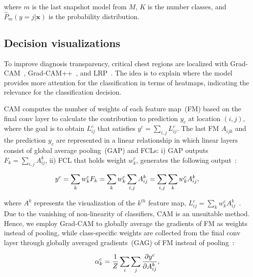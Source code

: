 \documentclass[conference]{IEEEtran}
\begin{document}
where $m$ is the last snapshot model from $M$, $K$ is the number classes, and $\hat{P}_{m}(y=j | \mathbf{x})$ is the probability distribution. 

\subsection{Decision visualizations}
To improve diagnosis transparency, critical chest regions are localized with Grad-CAM~\cite{114}, Grad-CAM++~\cite{chattopadhay2018grad}, and LRP~\cite{LRP2}. The idea is to explain where the model provides more attention for the classification in terms of heatmaps, 
indicating the relevance for the classification decision.

\iffalse
CAM computes the number of weights of each feature map~(FM) based on the final conv layer to calculate the contribution to prediction $y_c$ at location $(i,j)$, where the goal is to obtain $L_{ij}^{c}$ that satisfies $y^{c}=\sum_{i, j} L_{ij}^{c}$. The last FM $A_{ijk}$ and the prediction $y_c$ are represented in a linear relationship in which linear layers consist of global average pooling~(GAP) and FCLs: i) GAP outputs $F_{k}=\sum_{i,j} A^k_{ij}$, ii) FCL that holds weight $w_{k}^{c}$, generates the following output~\cite{kim2020extending}: 
 
 \begin{equation}
 \scriptsize{
     y^{c}=\sum_{k} w_{k}^{c} F_{k}=\sum_{k} w_{k}^{c} \sum_{i,j} A^k_{ij}=\sum_{i, j} \sum_{k} w_{k}^{c} A^k_{ij},}
 \end{equation}
 
where $A^{k}$ represents the visualization of the $k^{th}$ feature map, $L_{i j}^{c}=\sum_{k} w_{k}^{c} A^k_{ij}$~\cite{kim2020extending}. Due to the vanishing of non-linearity of classifiers, CAM is an unsuitable method. Hence, we employ Grad-CAM to globally average the gradients of FM as weights instead of pooling, while class-specific weights are collected from the final conv layer through globally averaged gradients~(GAG) of FM instead of pooling~\cite{chattopadhay2018grad}: 

\begin{equation}
\scriptsize{
    \alpha_k^c=\frac{1}{Z}\sum_{i}\sum_{j}\frac{\partial y^c}{\partial A_{ij}^k},}
    \label{eq:alpha}
\end{equation}
\end{document}
